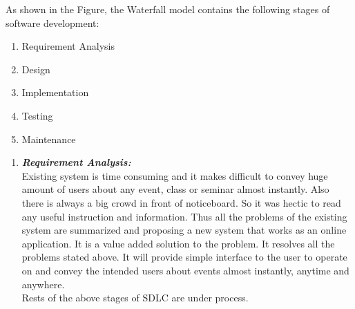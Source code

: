 As shown in the Figure, the Waterfall model contains the following stages of software
development:
\begin{enumerate}
\item Requirement Analysis
\item Design
\item Implementation
\item Testing
\item Maintenance
\end{enumerate}
\begin{enumerate}
\item \textbf{\emph{Requirement Analysis:}}\\
Existing system is time consuming and it makes difficult to convey huge amount of users about
any event, class or seminar almost instantly. Also there is always a big crowd in front of
noticeboard. So it was hectic to read any useful instruction and information. Thus all the
problems of the existing system are summarized and proposing a new system that works as an
online application. It is a value added solution to the problem. It resolves all the problems stated
above. It will provide simple interface to the user to operate on and convey the intended users
about events almost instantly, anytime and anywhere.\\
Rests of the above stages of SDLC are under process.
\end{enumerate}
